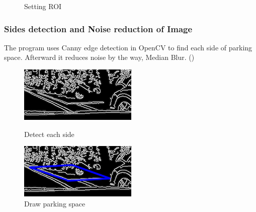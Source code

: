 \documentclass[journal,article,submit,moreauthors,pdftex,10pt,a4paper]{mdpi}
\begin{document}
\begin{figure}[tbp]
	\hspace{0.2in}
	\caption{Setting ROI}
	\label{fig:ROI}
\end{figure}

\subsubsection{Sides detection and Noise reduction of Image}

The program uses Canny edge detection in OpenCV to find each side of
parking space. Afterward it reduces noise by the way, Median Blur.
()

\begin{figure}[tbp]
	\begin{minipage}{.4\textwidth}
		\centering
		\includegraphics[scale=0.7,natwidth=444,natheight=236]{Figures/sideDetecting.png}
		\caption{Detect each side}
		\label{sideDetecting}
	\end{minipage}
	\hspace{0.5in}
	\begin{minipage}{.4\textwidth}
		\centering
		\includegraphics[scale=0.7,natwidth=444,natheight=237]{Figures/drawParkingSpace.png}
		\caption{Draw parking space}
		\label{drawParkingSpace}
	\end{minipage}
\end{figure}
\end{document}
